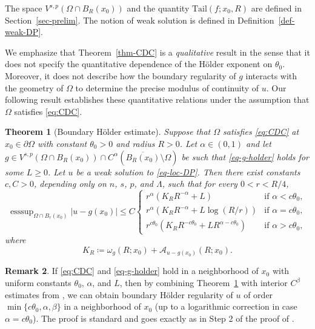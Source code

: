 \documentclass[11pt]{amsart}
\theoremstyle{plain}
\newtheorem{theorem}{Theorem}[section]
\theoremstyle{definition}
\newtheorem{remark}[theorem]{Remark}
\numberwithin{equation}{section}
\DeclareMathOperator*{\esssup}{esssup}
\begin{document}
The space $V^{s,p}(\Omega \cap B_R(x_0))$ and the quantity $\mathrm{Tail}(f; x_0, R)$ are defined in Section~\ref{sec-prelim}. The notion of weak solution is defined in Definition~\ref{def-weak-DP}.




We emphasize that Theorem~\ref{thm-CDC} is a \emph{qualitative} result in the sense that it does not specify the quantitative dependence of the H\"older exponent on $\theta_0$. Moreover, it does not describe how the boundary regularity of $g$ interacts with the geometry of $\Omega$ to determine the precise modulus of continuity of $u$. Our following result establishes these quantitative relations under the assumption that $\Omega$ satisfies \eqref{eq:CDC}.

\begin{theorem}[Boundary H\"older estimate]\label{thm-holder}
Suppose that $\Omega$ satisfies \eqref{eq:CDC} at $x_0 \in \partial \Omega$ with constant $\theta_0>0$ and radius $R>0$. Let $\alpha \in (0,1)$ and let $g \in V^{s, p}(\Omega \cap B_R(x_0)) \cap C^\alpha(\overline{B_R(x_0)} \setminus \Omega)$ be such that \eqref{eq-g-holder} holds for some $L \geq 0$.
Let $u$ be a weak solution to \eqref{eq-loc-DP}. Then there exist constants $c, C>0$, depending only on $n$, $s$, $p$, and $\Lambda$, such that for every $0<r<R/4$,
    \begin{equation*}
        \esssup_{\Omega\cap B_r(x_0)}|u-g(x_0)| \leq C
        \begin{cases}
            r^{\alpha} (K_RR^{-\alpha}+L) & \text{if $\alpha<c \theta_0$},\\
            r^{\alpha} (K_RR^{-\alpha}+L \log(R/r))  & \text{if $\alpha=c\theta_0$},\\
            r^{c\theta_0}  (K_R R^{-c\theta_0}+LR^{\alpha-c\theta_0})&\text{if $\alpha>c\theta_0$},
        \end{cases}
    \end{equation*}
    where
    \begin{equation*}
       K_R\coloneqq \omega_g(R;x_0)+\mathcal A_{u-g(x_0)}(R;x_0).
    \end{equation*}
\end{theorem}

\begin{remark}
    If \eqref{eq:CDC} and \eqref{eq-g-holder} hold in a neighborhood of $x_0$ with uniform constants $\theta_0$, $\alpha$, and $L$, then by combining Theorem~\ref{thm-holder} with interior $C^{\beta}$ estimates from \cite{DCKP14}, we can obtain boundary H\"older regularity of $u$ of order $\min\{c \theta_0,\alpha,\beta\}$ in a neighborhood of $x_0$ (up to a logarithmic correction in case $\alpha = c \theta_0$). The proof is standard and goes exactly as in Step 2 of the proof of \cite[Proposition 2.6.4]{FeRo24}.
\end{remark}
\end{document}
